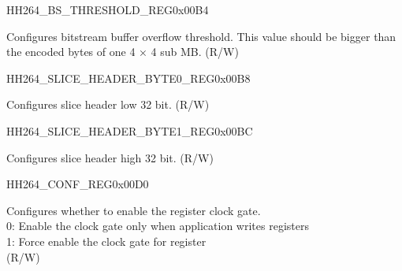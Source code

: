 \begin{register}{H}{H264\_BS\_THRESHOLD\_REG}{0x00B4}\label{regdesc:H264BSTHRESHOLDREG}
%
%
\regnewline%
\begin{regdesc}\begin{reglist}
\label{fielddesc:H264BSBUFFERTHRESHOLD}\item [H264\_BS\_BUFFER\_THRESHOLD] Configures bitstream buffer overflow threshold. This value should be bigger than the encoded bytes of one 4 × 4 sub MB. (R/W)
\end{reglist}\end{regdesc}
\end{register}


\begin{register}{H}{H264\_SLICE\_HEADER\_BYTE0\_REG}{0x00B8}\label{regdesc:H264SLICEHEADERBYTE0REG}
%
\regnewline%
\begin{regdesc}\begin{reglist}
\label{fielddesc:H264SLICEBYTELSB}\item [H264\_SLICE\_BYTE\_LSB] Configures slice header low 32 bit. (R/W)
\end{reglist}\end{regdesc}
\end{register}


\begin{register}{H}{H264\_SLICE\_HEADER\_BYTE1\_REG}{0x00BC}\label{regdesc:H264SLICEHEADERBYTE1REG}
%
\regnewline%
\begin{regdesc}\begin{reglist}
\label{fielddesc:H264SLICEBYTEMSB}\item [H264\_SLICE\_BYTE\_MSB] Configures slice header high 32 bit. (R/W)
\end{reglist}\end{regdesc}
\end{register}


\begin{register}{H}{H264\_CONF\_REG}{0x00D0}\label{regdesc:H264CONFREG}
%
%
\regnewline%
\begin{regdesc}\begin{reglist}
\label{fielddesc:H264CLKEN}\item [H264\_CLK\_EN] Configures whether to enable the register clock gate.\\0: Enable the clock gate only when application writes registers\\1: Force enable the clock gate for register \\(R/W)









\end{reglist}\end{regdesc}
\end{register}


